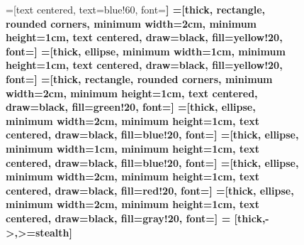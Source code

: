 \documentclass[
]{shtthesis}
\begin{document}
\begin{figure}[p]
  =[text centered, text=blue!60, font=\sffamily\bfseries]
  =[thick, rectangle, rounded corners, minimum width=2cm, minimum height=1cm, text centered, draw=black, fill=yellow!20, font=\sffamily\bfseries]
  =[thick, ellipse, minimum width=1cm, minimum height=1cm, text centered, draw=black, fill=yellow!20, font=\sffamily\bfseries]
  =[thick, rectangle, rounded corners, minimum width=2cm, minimum height=1cm, text centered, draw=black, fill=green!20, font=\sffamily\bfseries]
  =[thick, ellipse, minimum width=2cm, minimum height=1cm, text centered, draw=black, fill=blue!20, font=\sffamily\bfseries]
  =[thick, ellipse, minimum width=1cm, minimum height=1cm, text centered, draw=black, fill=blue!20, font=\sffamily\bfseries]
  =[thick, ellipse, minimum width=2cm, minimum height=1cm, text centered, draw=black, fill=red!20, font=\sffamily\bfseries]
  =[thick, ellipse, minimum width=2cm, minimum height=1cm, text centered, draw=black, fill=gray!20, font=\sffamily\bfseries]
   = [thick,->,>=stealth]
  \centering
  \begin{subfigure}[t]{0.45\columnwidth}
    \centering
\end{subfigure}
\end{figure}
\end{document}
